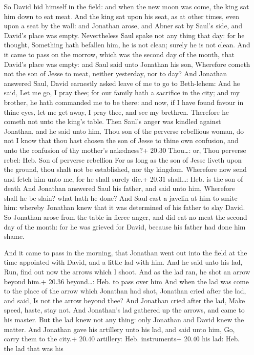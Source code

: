  So David hid himself in the field: and when the new moon
was come, the king sat him down to eat meat.  And the king
sat upon his seat, as at other times, even upon a seat by the wall: and
Jonathan arose, and Abner sat by Saul's side, and David's place was
empty.  Nevertheless Saul spake not any thing that day: for
he thought, Something hath befallen him, he is not clean; surely he is
not clean.  And it came to pass on the morrow, which was
the second day of the month, that David's place was empty: and Saul said
unto Jonathan his son, Wherefore cometh not the son of Jesse to meat,
neither yesterday, nor to day?  And Jonathan answered Saul,
David earnestly asked leave of me to go to Beth-lehem:  And
he said, Let me go, I pray thee; for our family hath a sacrifice in the
city; and my brother, he hath commanded me to be there: and now, if I
have found favour in thine eyes, let me get away, I pray thee, and see
my brethren. Therefore he cometh not unto the king's table.
 Then Saul's anger was kindled against Jonathan, and he
said unto him, Thou son of the perverse rebellious woman, do not I know
that thou hast chosen the son of Jesse to thine own confusion, and unto
the confusion of thy mother's nakedness?+ 20.30 Thou\ldots: or, Thou
perverse rebel: Heb. Son of perverse rebellion  For as long
as the son of Jesse liveth upon the ground, thou shalt not be
established, nor thy kingdom. Wherefore now send and fetch him unto me,
for he shall surely die.+ 20.31 shall\ldots: Heb. is the son of death
 And Jonathan answered Saul his father, and said unto him,
Wherefore shall he be slain? what hath he done?  And Saul
cast a javelin at him to smite him: whereby Jonathan knew that it was
determined of his father to slay David.  So Jonathan arose
from the table in fierce anger, and did eat no meat the second day of
the month: for he was grieved for David, because his father had done him
shame.

 And it came to pass in the morning, that Jonathan went
out into the field at the time appointed with David, and a little lad
with him.  And he said unto his lad, Run, find out now the
arrows which I shoot. And as the lad ran, he shot an arrow beyond him.+
20.36 beyond\ldots: Heb. to pass over him  And when the lad
was come to the place of the arrow which Jonathan had shot, Jonathan
cried after the lad, and said, Is not the arrow beyond thee?
 And Jonathan cried after the lad, Make speed, haste, stay
not. And Jonathan's lad gathered up the arrows, and came to his master.
 But the lad knew not any thing: only Jonathan and David
knew the matter.  And Jonathan gave his artillery unto his
lad, and said unto him, Go, carry them to the city.+ 20.40 artillery:
Heb. instruments+ 20.40 his lad: Heb. the lad that was his

